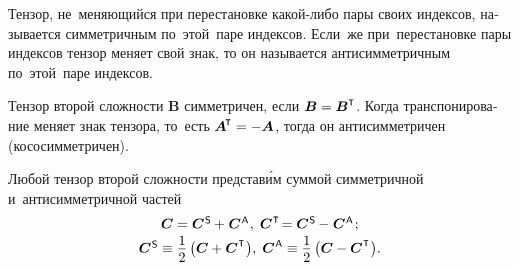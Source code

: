 

\begin{otherlanguage}{russian}

Тензор, не~меняющийся при перестановке какой\hbox{-}либо пары своих индексов, называется симметричным по~этой~паре индексов. Если~же при~перестановке пары индексов тензор меняет свой знак, то он называется антисимметричным по~этой~паре индексов.

Тензор второй сложности ${\bm{B}}$ симметричен, если ${\bm{B} = \bm{B}^\T}$. Когда транспонирование меняет знак тензора, то~есть ${\bm{A}^{\hspace{-0.1em}\T} = - \bm{A}}$, тогда он антисимметричен (кососимметричен).

Любой тензор второй сложности представ\'{и}м суммой симметричной и~антисимметричной частей
\vspace{0.2em}\begin{equation}\begin{array}{c}
\bm{C} = \bm{C}^{\mathsf{\hspace{0.1ex}S}} \hspace{-0.1ex}+\hspace{0.1ex} \bm{C}^{\mathsf{\hspace{0.1ex}A}}\hspace{0.1ex} , \;
\bm{C}^{\hspace{0.1ex}\T} \hspace{-0.32ex} = \bm{C}^{\mathsf{\hspace{0.1ex}S}} \hspace{-0.1ex}-\hspace{0.1ex} \bm{C}^{\mathsf{\hspace{0.1ex}A}}\hspace{0.2ex} ; \\[0.2em]
\bm{C}^{\mathsf{\hspace{0.1ex}S}} \equiv \displaystyle \onehalf \left({\bm{C} + \bm{C}^{\hspace{0.1ex}\T}}\hspace{0.1ex}\right)\!, \;
\bm{C}^{\mathsf{\hspace{0.1ex}A}} \equiv \displaystyle \onehalf \left({\bm{C} - \bm{C}^{\hspace{0.1ex}\T}}\hspace{0.1ex}\right)\!.
\end{array}\end{equation}


\end{otherlanguage}
